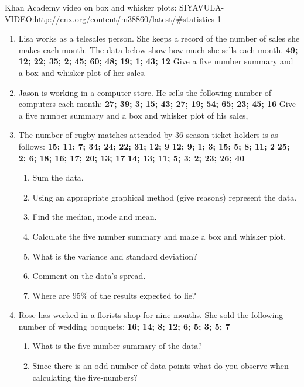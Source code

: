 Khan Academy video on box and whisker plots: SIYAVULA-VIDEO:http://cnx.org/content/m38860/latest/#statistics-1
{
\begin{enumerate}
\item Lisa works as a telesales person. She keeps a record of the number of sales she makes each month. The data below show how much she sells each month. \newline
\textbf{49; 12; 22; 35; 2; 45; 60; 48; 19; 1; 43; 12} \newline
Give a five number summary and a box and whisker plot of her sales. 
\item Jason is working in a computer store. He sells the following number of computers each month: \newline
\textbf{27; 39; 3; 15; 43; 27; 19; 54; 65; 23; 45; 16} \newline
Give a five number summary and a box and whisker plot of his sales,
\item The number of rugby matches attended by 36 season ticket holders is as follows: \newline
\textbf{15; 11; 7; 34; 24; 22; 31; 12; 9} \newline
\textbf{12; 9; 1; 3; 15; 5; 8; 11; 2} \newline
\textbf{25; 2; 6; 18; 16; 17; 20; 13; 17} \newline
\textbf{14; 13; 11; 5; 3; 2; 23; 26; 40} \newline
	\begin{enumerate}
	\item Sum the data.
	\item Using an appropriate graphical method (give reasons) represent the data.
	\item Find the median, mode and mean.
	\item Calculate the five number summary and make a box and whisker plot.
	\item What is the variance and standard deviation?
	\item Comment on the data's spread.
	\item Where are 95\% of the results expected to lie?
	\end{enumerate}
\item Rose has worked in a florists shop for nine months. She sold the following number of wedding bouquets: \newline
\textbf{16; 14; 8; 12; 6; 5; 3; 5; 7} \newline
	\begin{enumerate}
	\item What is the five-number summary of the data?
	\item Since there is an odd number of data points what do you observe when calculating the five-numbers?
	\end{enumerate}
\end{enumerate}
}


